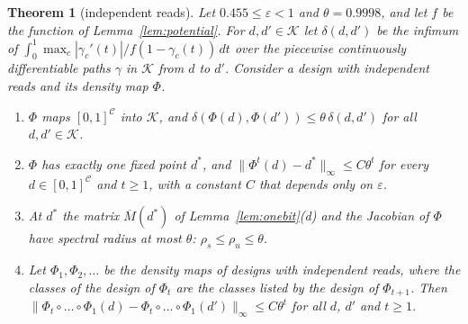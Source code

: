 \documentclass[11pt]{amsart}
\newtheorem{theorem}{Theorem}
\theoremstyle{definition}
\theoremstyle{remark}
\newcommand{\eps}{\varepsilon}
\begin{document}
\begin{theorem}[independent reads]\label{thm:indep}
Let $0.455\le\eps<1$ and $\theta=0.9998$, and let $f$ be the function of
Lemma~\ref{lem:potential}. For $d,d'\in\mathcal K$ let $\delta(d,d')$ be the infimum of
$\int_0^1\max_c|\gamma_c'(t)|/f(1-\gamma_c(t))\,dt$ over the piecewise continuously
differentiable paths $\gamma$ in $\mathcal K$ from $d$ to $d'$. Consider a design with independent reads
and its density map $\Phi$.
\begin{enumerate}[label=(\alph*),leftmargin=2.4em]
\item $\Phi$ maps $[0,1]^{\mathcal C}$ into $\mathcal K$, and
$\delta(\Phi(d),\Phi(d'))\le\theta\,\delta(d,d')$ for all $d,d'\in\mathcal K$.
\item $\Phi$ has exactly one fixed point $d^*$, and
$\|\Phi^{t}(d)-d^*\|_\infty\le C\theta^{t}$ for every $d\in[0,1]^{\mathcal C}$ and $t\ge1$, with
a constant $C$ that depends only on $\eps$.
\item At $d^*$ the matrix $\overline M(d^*)$ of Lemma~\ref{lem:onebit}(d) and the Jacobian of $\Phi$
have spectral radius at most $\theta$: $\rho_s\le\rho_u\le\theta$.
\item Let $\Phi_1,\Phi_2,\dots$ be the density maps of designs with independent reads, where the
classes of the design of $\Phi_{t}$ are the classes listed by the design of $\Phi_{t+1}$. Then
$\|\Phi_t\circ\dots\circ\Phi_1(d)-\Phi_t\circ\dots\circ\Phi_1(d')\|_\infty\le C\theta^{t}$ for all
$d$, $d'$ and $t\ge1$.
\end{enumerate}
\end{theorem}
\end{document}
